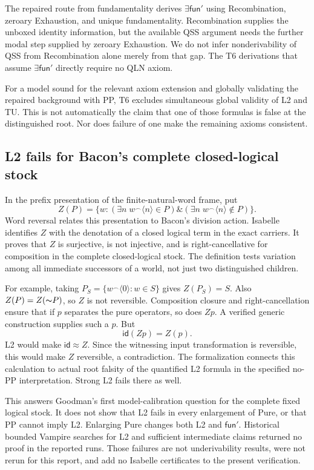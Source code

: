 \documentclass[12pt,leqno]{article}
\newcommand{\AND}{\ensuremath{\mathbin{\&}}}
\newcommand{\NOT}{\ensuremath{\text{$\thicksim$}}}
\newcommand{\funp}{\mathsf{fun}'}
\newcommand{\id}{\mathsf{id}}
\begin{document}
The repaired route from fundamentality derives $\exists\funp$ using
Recombination, zeroary Exhaustion, and unique fundamentality. Recombination
supplies the unboxed identity information, but the available QSS argument
needs the further modal step supplied by zeroary Exhaustion. We do not
infer nonderivability of QSS from Recombination alone merely from that gap.
The T6 derivations that assume $\exists\funp$ directly require no QLN axiom.

For a model sound for the relevant axiom extension and globally validating
the repaired background with PP, T6 excludes simultaneous global validity
of L2 and TU. This is not automatically the claim that one of those formulas
is false at the distinguished root. Nor does failure of one make the
remaining axioms consistent.

\subsection{L2 fails for Bacon's complete closed-logical stock}

In the prefix presentation of the finite-natural-word frame, put
\[
 Z(P)=\{w:(\exists n\;w^\frown\langle n\rangle\in P)
             \AND(\exists n\;w^\frown\langle n\rangle\notin P)\}.
\]
Word reversal relates this presentation to Bacon's division action.
Isabelle identifies $Z$ with the denotation of a closed logical term in
the exact carriers. It proves that $Z$ is surjective, is not injective,
and is right-cancellative for composition in the complete closed-logical
stock. The definition tests variation among all immediate successors of a
world, not just two distinguished children.

For example, taking
$P_S=\{w^\frown\langle0\rangle:w\in S\}$ gives $Z(P_S)=S$.
Also $Z(P)=Z(\NOT P)$, so $Z$ is not reversible. Composition closure and
right-cancellation ensure that if $p$ separates the pure operators, so
does $Zp$. A verified generic construction supplies such a $p$. But
\[
 \id(Zp)=Z(p).
\]
L2 would make $\id\approx Z$. Since the witnessing input transformation
is reversible, this would make $Z$ reversible, a contradiction. The
formalization connects this calculation to actual root falsity of the
quantified L2 formula in the specified no-PP interpretation. Strong L2
fails there as well.

This answers Goodman's first model-calibration question for the complete
fixed logical stock. It does not show that L2 fails in every enlargement
of Pure, or that PP cannot imply L2. Enlarging Pure changes both L2 and
$\funp$. Historical bounded Vampire searches for L2 and sufficient
intermediate claims returned no proof in the reported runs. Those failures
are not underivability results, were not rerun for this report, and add no
Isabelle certificates to the present verification.
\end{document}
